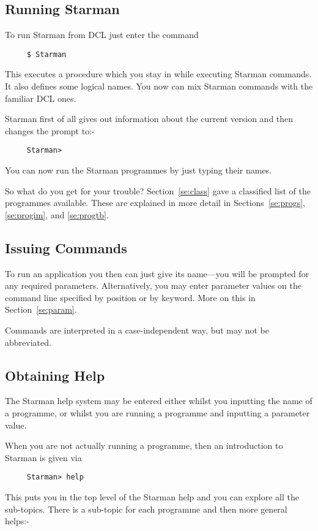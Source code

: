 \subsection{Running Starman}

To run Starman from {\small DCL} just enter the command

\begin{verbatim}
     $ Starman
\end{verbatim}

This executes a procedure which you stay in while executing Starman 
commands. It also defines some logical names. You now can
mix Starman commands with the familiar {\small DCL} ones.

Starman first of all gives out information about the current version and 
then changes the prompt to:-

\begin{verbatim}
     Starman>
\end{verbatim}

You can now run the Starman programmes by just typing their names.

So what do you get for your trouble?  Section~\ref{se:class} gave a classified
list of the programmes available. These are explained in more detail in
Sections~\ref{se:progs}, \ref{se:progim}, and \ref{se:progtb}.

\subsection{Issuing Commands}

To run an application you then can just give its name---you will be
prompted for any required parameters. Alternatively, you may enter
parameter values on the command line specified by position or by
keyword.  More on this in Section~\ref{se:param}.

Commands are interpreted in a case-independent way, but may not be
abbreviated.


\subsection{Obtaining Help}

The Starman help system may be entered either whilst you inputting the
name of a programme, or whilst you are running a programme and inputting
a parameter value.

When you 
are not actually running a programme, then an introduction to Starman is given via
\begin{verbatim}
     Starman> help 
\end{verbatim}
This puts you in the top level of the Starman help and you can explore all 
the sub-topics. There is a sub-topic for each programme and then more
general helps:-

